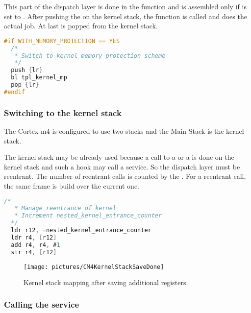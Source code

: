 This part of the dispatch layer is done in the  function and is assembled only if  is set to \YES. After pushing the  on the kernel stack, the  function is called and does the actual job. At last  is popped from the kernel stack.

\begin{lstlisting}[language=C]
#if WITH_MEMORY_PROTECTION == YES
  /*
   * Switch to kernel memory protection scheme
   */
  push {lr}
  bl tpl_kernel_mp
  pop {lr}
#endif
\end{lstlisting}

\subsubsection{Switching to the kernel stack}

The Cortex-m4 is configured to use two stacks and the Main Stack is the kernel stack.

The kernel stack may be already used because a call to a  or a  is done on the kernel stack and such a hook may call a service. So the dispatch layer must be reentrant. The number of reentrant calls is counted by the . For a reentrant call, the same frame is build over the current one.

\begin{lstlisting}[language=C]
  /* 
   * Manage reentrance of kernel
   * Increment nested_kernel_entrance_counter
  */
  ldr r12, =nested_kernel_entrance_counter
  ldr r4, [r12]
  add r4, r4, #1
  str r4, [r12]
\end{lstlisting}

\begin{figure}[htbp] %
\begin{minipage}{0.5\textwidth}
    \centering
  \texttt{[image: pictures/CM4KernelStackSaveDone]} 
\end{minipage}
\begin{minipage}{0.5\textwidth}
   \caption{Kernel stack mapping after saving additional registers.}\label{fig:CM4KernelStackSaveDone}
\end{minipage}
\end{figure}

\subsubsection{Calling the service}

